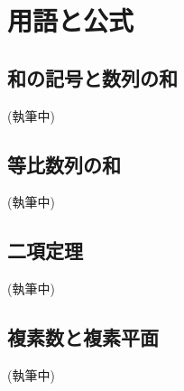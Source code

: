\chapter{用語と公式}\label{章:用語と公式}
\section{和の記号と数列の和}\label{節:用語和の記号}
(執筆中)
\section{等比数列の和}\label{節:用語等比数列}
(執筆中)
\section{二項定理}\label{節:用語二項定理}
(執筆中)
\section{複素数と複素平面}\label{節:用語複素数}
(執筆中)
